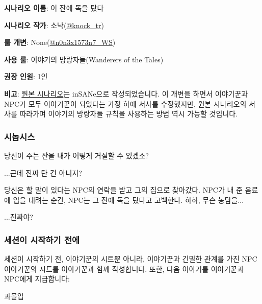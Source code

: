 \documentclass{report}
\begin{document}
	\textbf{시나리오 이름}: 이 잔에 독을 탔다
	
	\textbf{시나리오 작가}: 소낙(\href{https://twitter.com/knock_tr}{@knock\_tr})
	
	\textbf{룰 개변}: None(\href{https://www.twitter.com/n0n3x1573n7_WS}{@n0n3x1573n7\_WS})
	
	\textbf{사용 룰}: 이야기의 방랑자들(Wanderers of the Tales)
	
	\textbf{권장 인원}: 1인
	
	\textbf{비고}: \href{https://fwalker.postype.com/post/3654634}{원본 시나리오}는 inSANe으로 작성되었습니다. 이 개변을 하면서 이야기꾼과 NPC가 모두 이야기꾼이 되었다는 가정 하에 서사를 수정했지만, 원본 시나리오의 서사를 따라가며 이야기의 방랑자들 규칙을 사용하는 방법 역시 가능할 것입니다.
	
	\subsubsection*{시놉시스}
	{\storyfont 당신이 주는 잔을 내가 어떻게 거절할 수 있겠소?}
	
	{\storyfont ...근데 진짜 탄 건 아니지?}
	
	당신은 할 말이 있다는 NPC의 연락을 받고 그의 집으로 찾아갔다. NPC가 내 준 음료에 입을 대려는 순간, NPC는 그 잔에 독을 탔다고 고백한다. 하하, 무슨 농담을...
	
	...진짜야?
	
	\subsubsection*{세션이 시작하기 전에}
		세션이 시작하기 전, 이야기꾼의 시트뿐 아니라, 이야기꾼과 긴밀한 관계를 가진 NPC 이야기꾼의 시트를 이야기꾼과 함께 작성합니다. 또한, 다음 이야기를 이야기꾼과 NPC에게 지급합니다:
		
		\begin{lite}{과몰입}
		\end{lite}
\end{document}
